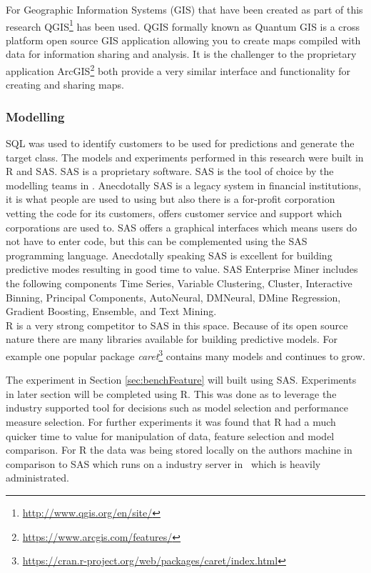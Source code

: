 For Geographic Information Systems (GIS) that have been created as part of this research QGIS\footnote{\url{http://www.qgis.org/en/site/}} has been used. QGIS formally known as Quantum GIS is a cross platform open source GIS application allowing you to create maps compiled with data for information sharing and analysis. It is the challenger to the proprietary application ArcGIS\footnote{\url{https://www.arcgis.com/features/}} both provide a very similar interface and functionality for creating and sharing maps.

\subsubsection{Modelling}
SQL was used to identify customers to be used for predictions and generate the target class.
The models and experiments performed in this research were built in R and SAS. SAS is a proprietary software. SAS is the tool of choice by the modelling teams in \subjectname. Anecdotally SAS is a legacy system in financial institutions, it is what people are used to using but also there is a for-profit corporation vetting the code for its customers, offers customer service and support which corporations are used to. SAS offers a graphical interfaces which means users do not have to enter code, but this can be complemented using the SAS programming language. Anecdotally speaking SAS is excellent for building predictive modes resulting in good time to value. SAS Enterprise Miner includes the following components Time Series, Variable Clustering, Cluster, Interactive Binning, Principal Components, AutoNeural, DMNeural, DMine Regression, Gradient Boosting, Ensemble, and Text Mining.
\\
R is a very strong competitor to SAS in this space. Because of its open source nature there are many libraries available for building predictive models. For example one popular package \textit{caret}\footnote{{\url{https://cran.r-project.org/web/packages/caret/index.html}}} contains many models and continues to grow.

The experiment in Section \ref{sec:benchFeature} will built using SAS. Experiments in later section will be completed using R. This was done as to leverage the industry supported tool for decisions such as model selection and performance measure selection. For further experiments it was found that R had a much quicker time to value for manipulation of data, feature selection and model comparison. For R the data was being stored locally on the authors machine in comparison to SAS which runs on a industry server in \subjectname\ which is heavily administrated.  


